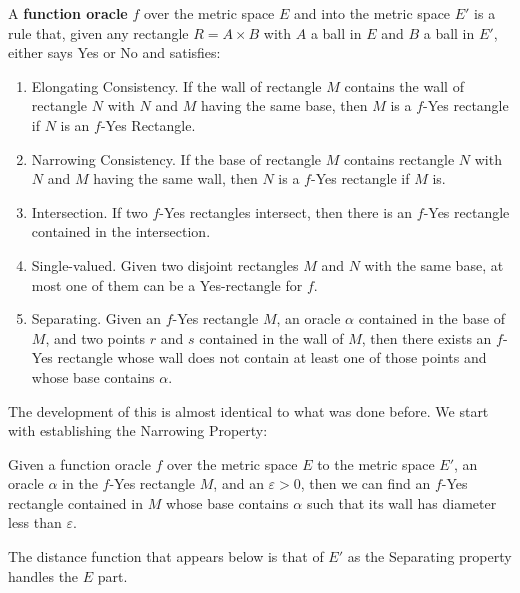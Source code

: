 A \textbf{function oracle} $f$ over the metric space $E$ and into the metric space $E'$ is a rule that, given any rectangle $R= A \times B$ with $A$ a ball in $E$ and $B$ a ball in  $E'$, either says Yes or No and satisfies: 
\begin{enumerate}
    \item Elongating Consistency. If the wall of rectangle $M$ contains the wall of rectangle $N$ with $N$ and $M$ having the same base,  then $M$ is a $f$-Yes rectangle if $N$  is an $f$-Yes Rectangle. 
    \item Narrowing Consistency. If the base of rectangle $M$ contains rectangle $N$ with $N$ and $M$ having the same wall, then $N$ is a $f$-Yes rectangle if $M$ is. 
    \item Intersection. If two $f$-Yes rectangles intersect, then there is an $f$-Yes rectangle contained in the intersection. 
    \item Single-valued. Given two disjoint rectangles $M$ and $N$ with the same base, at most one of them can be a Yes-rectangle for $f$. 
    \item Separating. Given an $f$-Yes rectangle $M$, an oracle $\alpha$ contained in the base of $M$, and two points $r$ and $s$ contained in the wall of $M$, then there exists an $f$-Yes rectangle whose wall does not contain at least one of those points and whose base contains $\alpha$.
\end{enumerate} 

The development of this is almost identical to what was done before. We start with establishing the Narrowing Property: 

\begin{proposition}\label{pr:metricfshrink}
Given a function oracle $f$ over the metric space $E$ to the metric space $E'$, an oracle $\alpha$ in the $f$-Yes rectangle $M$, and an $\varepsilon > 0$, then we can find an $f$-Yes rectangle contained in $M$ whose base contains $\alpha$ such that its wall has diameter less than $\varepsilon$.
\end{proposition}

The distance function that appears below is that of $E'$ as the Separating property handles the $E$ part. 

